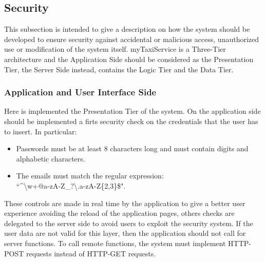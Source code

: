 \subsection{Security}
This subsection is intended to give a description on how the system should be developed to ensure security against accidental or malicious access, unauthorized use or modification of the system itself.
myTaxiService is a Three-Tier architecture and the Application Side should be considered as the Presentation Tier, the Server Side instead, contains the Logic Tier and the Data Tier.

	\subsubsection{Application and User Interface Side}
	Here is implemented the Presentation Tier of the system.
	On the application side should be implemented a firts security check on the credentials that the user has to insert. In particular: 
		\begin{itemize}
			\item Passwords must be at least 8 characters long and must contain digits and alphabetic characters.
			\item The emails must match the regular expression:\\ \textquotedblleft\textasciicircum\textbackslash w+@\lbrack a-zA-Z\_\rbrack\plus?\textbackslash.\lbrack a-zA-Z\rbrack\{2,3\}\$".
		\end{itemize}  
	These controls are made in real time by the application to give a better user experience avoiding the reload of the application pages, others checks are delegated to the server side to avoid users to exploit the security system.
	If the user data are not valid for this layer, then the application should not call for server functions.
	To call remote functions, the system must implement HTTP-POST requests instead of HTTP-GET requests.

